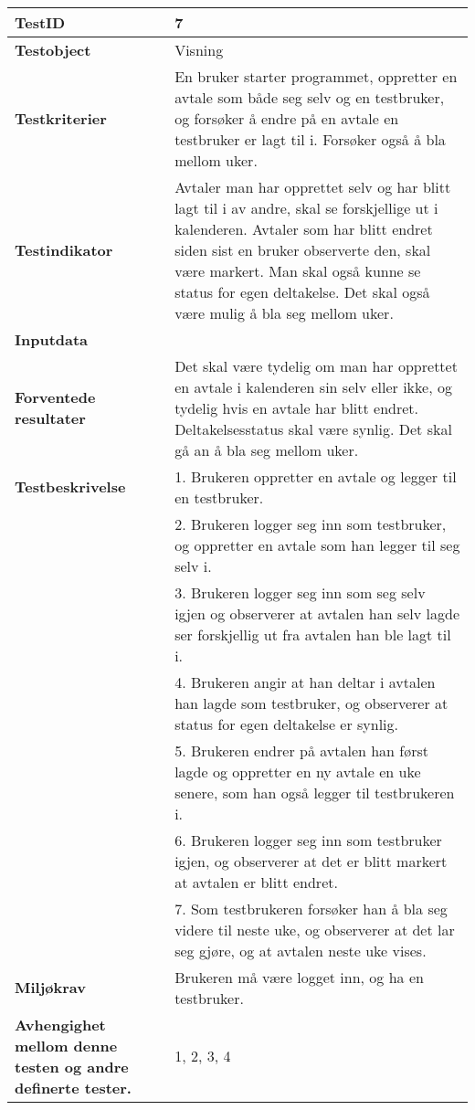 \mbox{}\\


	\begin{tabularx}{1.2\textwidth}{| p{5cm} | X |}
	\hline
	\textbf{TestID} 																& 7																	\\ \hline
	\textbf{Testobject} 															& Visning															\\ \hline
	\textbf{Testkriterier} 															& En bruker starter programmet, oppretter en avtale som både seg selv og en testbruker, og forsøker å endre på en avtale en testbruker er lagt til i. Forsøker også å bla mellom uker.						\\ \hline
	\textbf{Testindikator} 															& Avtaler man har opprettet selv og har blitt lagt til i av andre, skal se forskjellige ut i kalenderen. Avtaler som har blitt endret siden sist en bruker observerte den, skal være markert. Man skal også kunne se status for egen deltakelse. Det skal også være mulig å bla seg mellom uker.													\\ \hline
	\textbf{Inputdata} 															& 																	\\  \hline
	\textbf{Forventede resultater}									 				& Det skal være tydelig om man har opprettet en avtale i kalenderen sin selv eller ikke, og tydelig hvis en avtale har blitt endret. Deltakelsesstatus skal være synlig. Det skal gå an å bla seg mellom uker.				\\ \hline
	\textbf{Testbeskrivelse} 														& 1. Brukeren oppretter en avtale og legger til en testbruker.\\
																			& 2. Brukeren logger seg inn som testbruker, og oppretter en avtale som han legger til seg selv i.\\
																			& 3. Brukeren logger seg inn som seg selv igjen og observerer at avtalen han selv lagde ser forskjellig ut fra avtalen han ble lagt til i.\\
																			& 4. Brukeren angir at han deltar i avtalen han lagde som testbruker, og observerer at status for egen deltakelse er synlig.\\
																			& 5. Brukeren endrer på avtalen han først lagde og oppretter en ny avtale en uke senere, som han også legger til testbrukeren i.\\
																			& 6. Brukeren logger seg inn som testbruker igjen, og observerer at det er blitt markert at avtalen er blitt endret.\\
																			& 7. Som testbrukeren forsøker han å bla seg videre til neste uke, og observerer at det lar seg gjøre, og at avtalen neste uke vises.						\\ \hline
	\textbf{Miljøkrav}															& Brukeren må være logget inn, og ha en testbruker. \\ \hline
	\textbf{Avhengighet mellom denne testen og andre definerte tester.}		 				& 1, 2, 3, 4			 													\\ \hline
	\end{tabularx}

